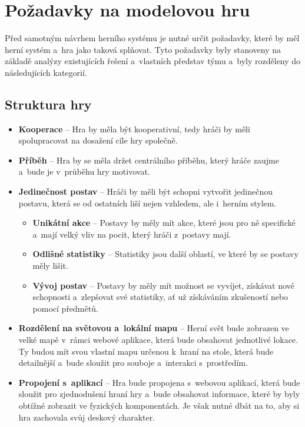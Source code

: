 \chapter{Požadavky na modelovou hru}
\label{chap:requirements}

Před samotným návrhem herního systému je nutné určit požadavky, které by měl herní systém a~hra jako taková splňovat. Tyto požadavky byly stanoveny na základě analýzy existujících řešení  a~vlastních představ týmu a~byly rozděleny do následujících kategorií.

\section{Struktura hry}
\label{sec:req_structure}

\begin{itemize}
    \item \textbf{Kooperace} -- 
        Hra by měla být kooperativní, tedy hráči by měli spolupracovat na dosažení cíle hry společně.
    \item \textbf{Příběh} -- 
        Hra by se měla držet centrálního příběhu, který hráče zaujme a~bude je v~průběhu hry motivovat.
    \item \textbf{Jedinečnost postav} -- 
        Hráči by měli být schopni vytvořit jedinečnou postavu, která se od ostatních liší nejen vzhledem, ale i~herním stylem.

    \begin{itemize}
        \item \textbf{Unikátní akce} -- 
            Postavy by měly mít akce, které jsou pro ně specifické a~mají velký vliv na pocit, který hráči z~postavy mají.
        \item \textbf{Odlišné statistiky} -- 
            Statistiky jsou další oblastí, ve které by se postavy měly lišit.
        \item \textbf{Vývoj postav} -- 
            Postavy by měly mít možnost se vyvíjet, získávat nové schopnosti a~zlepšovat své statistiky, ať už získáváním zkušeností nebo pomocí předmětů.
    \end{itemize}

    \item \textbf{Rozdělení na světovou a~lokální mapu} -- 
        Herní svět bude zobrazen ve velké mapě v~rámci webové aplikace, která bude obsahovat jednotlivé lokace. Ty budou mít svou vlastní mapu určenou k~hraní na stole, která bude detailnější a~bude sloužit pro souboje a~interakci s~prostředím.
    \item \textbf{Propojení s~aplikací} -- 
        Hra bude propojena s~webovou aplikací, která bude sloužit pro zjednodušení hraní hry a~bude obsahovat informace, které by byly obtížné zobrazit ve fyzických komponentách. Je však nutné dbát na to, aby si hra zachovala svůj deskový charakter.
\end{itemize}

